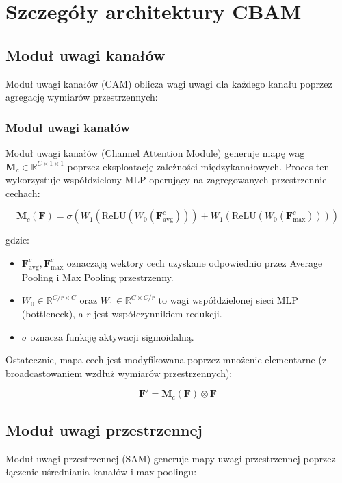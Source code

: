 \appendix

\section{Szczegóły architektury CBAM}
\label{app:cbam}

\subsection{Moduł uwagi kanałów}
Moduł uwagi kanałów (CAM) oblicza wagi uwagi dla każdego kanału poprzez agregację wymiarów przestrzennych:

\subsubsection{Moduł uwagi kanałów}
Moduł uwagi kanałów (Channel Attention Module) generuje mapę wag $\mathbf{M}_c \in \mathbb{R}^{C \times 1 \times 1}$ poprzez eksploatację zależności międzykanałowych. Proces ten wykorzystuje współdzielony MLP operujący na zagregowanych przestrzennie cechach:

\begin{equation}
\mathbf{M}_c(\mathbf{F}) = \sigma\left( W_1(\text{ReLU}(W_0(\mathbf{F}^c_{\text{avg}}))) + W_1(\text{ReLU}(W_0(\mathbf{F}^c_{\text{max}}))) \right)
\end{equation}

gdzie:
\begin{itemize}
    \item $\mathbf{F}^c_{\text{avg}}, \mathbf{F}^c_{\text{max}}$ oznaczają wektory cech uzyskane odpowiednio przez Average Pooling i Max Pooling przestrzenny.
    \item $W_0 \in \mathbb{R}^{C/r \times C}$ oraz $W_1 \in \mathbb{R}^{C \times C/r}$ to wagi współdzielonej sieci MLP (bottleneck), a $r$ jest współczynnikiem redukcji.
    \item $\sigma$ oznacza funkcję aktywacji sigmoidalną.
\end{itemize}

Ostatecznie, mapa cech jest modyfikowana poprzez mnożenie elementarne (z broadcastowaniem wzdłuż wymiarów przestrzennych):

\begin{equation}
\mathbf{F}' = \mathbf{M}_c(\mathbf{F}) \otimes \mathbf{F}
\end{equation}

\subsection{Moduł uwagi przestrzennej}
Moduł uwagi przestrzennej (SAM) generuje mapy uwagi przestrzennej poprzez łączenie uśredniania kanałów i max poolingu:

